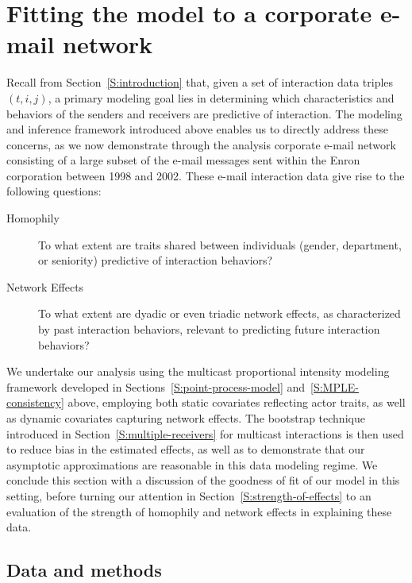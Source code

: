 \documentclass[final]{statsoc}
\begin{document}
\section{Fitting the model to a corporate e-mail network}\label{S:enron-modeling}

Recall from Section~\ref{S:introduction} that, given a set of interaction data triples $(t,i,j)$, a primary modeling goal lies in determining which characteristics and behaviors of the senders and receivers are predictive of interaction.  The modeling and inference framework introduced above enables us to directly address these concerns, as we now demonstrate through the analysis corporate e-mail network consisting of a large subset of the e-mail messages sent within the Enron corporation between 1998 and 2002.  These e-mail interaction data give rise to the following questions:

\begin{description}
    \item[Homophily] To what extent are traits shared between individuals (gender, department, or seniority) predictive of interaction behaviors?

    \item[Network Effects] To what extent are dyadic or even triadic network effects, as characterized by past interaction behaviors, relevant to predicting future interaction behaviors?
\end{description}

We undertake our analysis using the multicast proportional intensity modeling framework developed in Sections~\ref{S:point-process-model} and~\ref{S:MPLE-consistency} above, employing both static covariates reflecting actor traits, as well as dynamic covariates capturing network effects.  The bootstrap technique introduced in Section~\ref{S:multiple-receivers} for multicast interactions is then used to reduce bias in the estimated effects, as well as to demonstrate that our asymptotic approximations are reasonable in this data modeling regime.  We conclude this section with a discussion of the goodness of fit of our model in this setting, before turning our attention in Section~\ref{S:strength-of-effects} to an evaluation of the strength of homophily and network effects in explaining these data.

\subsection{Data and methods}
\end{document}
